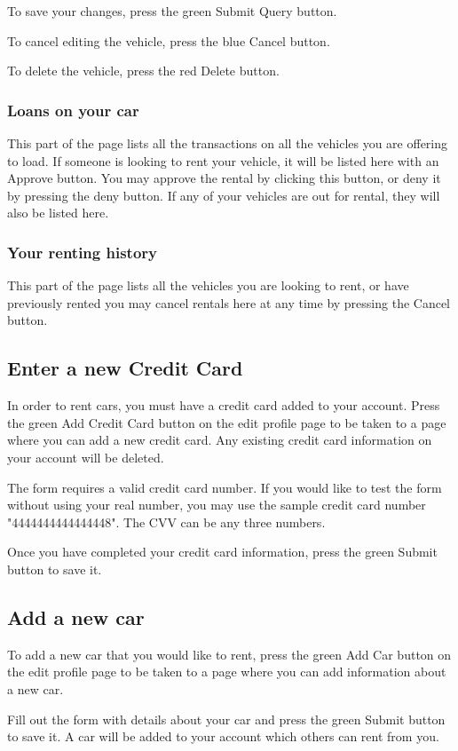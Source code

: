\documentclass{article}
\begin{document}
To save your changes, press the green Submit Query button.

To cancel editing the vehicle, press the blue Cancel button.

To delete the vehicle, press the red Delete button.

\subsubsection{Loans on your car}
This part of the page lists all the transactions on all the vehicles you are offering to load. If someone is looking to rent your vehicle, it will be listed here with an Approve button. You may approve the rental by clicking this button, or deny it by pressing the deny button. If any of your vehicles are out for rental, they will also be listed here.

\subsubsection{Your renting history}
This part of the page lists all the vehicles you are looking to rent, or have previously rented you may cancel rentals here at any time by pressing the Cancel button.

\subsection{Enter a new Credit Card}
In order to rent cars, you must have a credit card added to your account. Press the green Add Credit Card button on the edit profile page to be taken to a page where you can add a new credit card. Any existing credit card information on your account will be deleted.

The form requires a valid credit card number. If you would like to test the form without using your real number, you may use the sample credit card number "4444444444444448". The CVV can be any three numbers.

Once you have completed your credit card information, press the green Submit button to save it.

\subsection{Add a new car}
To add a new car that you would like to rent, press the green Add Car button on the edit profile page to be taken to a page where you can add information about a new car.

Fill out the form with details about your car and press the green Submit button to save it. A car will be added to your account which others can rent from you.
\end{document}
